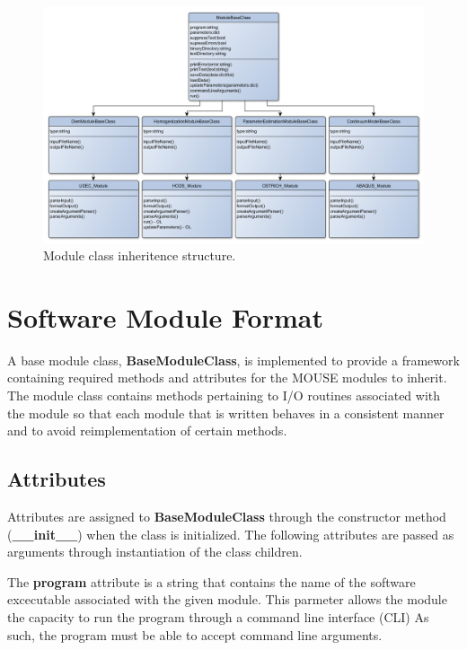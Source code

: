 \begin{figure}[!htb]
\begin{center}
\includegraphics[width=\textwidth]{figures/Chapter4/ModuleClassUML}
\caption{{\label{fig:moduleClass} Module class inheritence structure.%
}}
\end{center}
\end{figure}

\section{Software Module Format}

A base module class, \textbf{BaseModuleClass}, is implemented to provide a framework containing required methods and attributes for the MOUSE modules to inherit. The module class contains methods pertaining to I/O routines associated with the module so that each module that is written behaves in a consistent manner and to avoid reimplementation of certain methods. 

\subsection{Attributes}

Attributes are assigned to \textbf{BaseModuleClass} through the constructor method (\textbf{\_\_init\_\_}) when the class is initialized. The following attributes are passed as arguments through instantiation of the class children. 

The \textbf{program} attribute is a string that contains the name of the software excecutable associated with the given module. This parmeter allows the module the capacity to run the program through a command line interface (CLI) As such, the program must be able to accept command line arguments.

